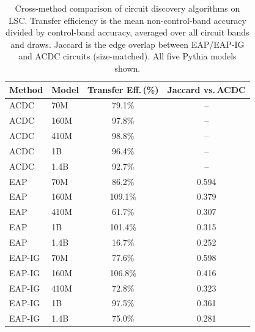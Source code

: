 \begin{table}[t]
\centering
\caption{Cross-method comparison of circuit discovery algorithms on LSC.
Transfer efficiency is the mean non-control-band accuracy divided by
control-band accuracy, averaged over all circuit bands and draws.
Jaccard is the edge overlap between EAP/EAP-IG and ACDC circuits
(size-matched). All five Pythia models shown.}
\label{tab:method_comparison}
\begin{tabular}{llcc}
\toprule
Method & Model & Transfer Eff.\,(\%) & Jaccard vs.\,ACDC \\
\midrule
ACDC & 70M & 79.1\% & -- \\
ACDC & 160M & 97.8\% & -- \\
ACDC & 410M & 98.8\% & -- \\
ACDC & 1B & 96.4\% & -- \\
ACDC & 1.4B & 92.7\% & -- \\
\addlinespace[2pt]
EAP & 70M & 86.2\% & 0.594 \\
EAP & 160M & 109.1\% & 0.379 \\
EAP & 410M & 61.7\% & 0.307 \\
EAP & 1B & 101.4\% & 0.315 \\
EAP & 1.4B & 16.7\% & 0.252 \\
\addlinespace[2pt]
EAP-IG & 70M & 77.6\% & 0.598 \\
EAP-IG & 160M & 106.8\% & 0.416 \\
EAP-IG & 410M & 72.8\% & 0.323 \\
EAP-IG & 1B & 97.5\% & 0.361 \\
EAP-IG & 1.4B & 75.0\% & 0.281 \\
\bottomrule
\end{tabular}
\end{table}